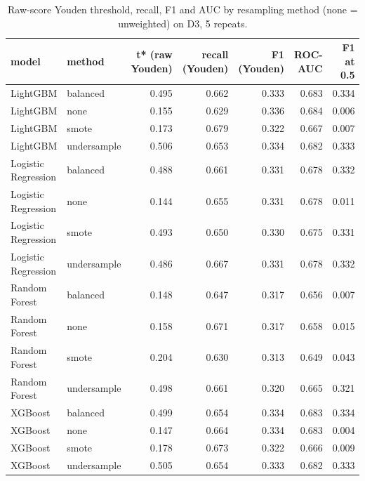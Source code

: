 \begin{table}[t]
\centering
\caption{Raw-score Youden threshold, recall, F1 and AUC by resampling method (none = unweighted) on D3, 5 repeats.}
\label{tab:T11a_resampling}
\small
\begin{tabular}{llrrrrr}
\toprule
model & method & t* (raw Youden) & recall (Youden) & F1 (Youden) & ROC-AUC & F1 at 0.5 \\
\midrule
LightGBM & balanced & 0.495 & 0.662 & 0.333 & 0.683 & 0.334 \\
LightGBM & none & 0.155 & 0.629 & 0.336 & 0.684 & 0.006 \\
LightGBM & smote & 0.173 & 0.679 & 0.322 & 0.667 & 0.007 \\
LightGBM & undersample & 0.506 & 0.653 & 0.334 & 0.682 & 0.333 \\
Logistic Regression & balanced & 0.488 & 0.661 & 0.331 & 0.678 & 0.332 \\
Logistic Regression & none & 0.144 & 0.655 & 0.331 & 0.678 & 0.011 \\
Logistic Regression & smote & 0.493 & 0.650 & 0.330 & 0.675 & 0.331 \\
Logistic Regression & undersample & 0.486 & 0.667 & 0.331 & 0.678 & 0.332 \\
Random Forest & balanced & 0.148 & 0.647 & 0.317 & 0.656 & 0.007 \\
Random Forest & none & 0.158 & 0.671 & 0.317 & 0.658 & 0.015 \\
Random Forest & smote & 0.204 & 0.630 & 0.313 & 0.649 & 0.043 \\
Random Forest & undersample & 0.498 & 0.661 & 0.320 & 0.665 & 0.321 \\
XGBoost & balanced & 0.499 & 0.654 & 0.334 & 0.683 & 0.334 \\
XGBoost & none & 0.147 & 0.664 & 0.334 & 0.683 & 0.004 \\
XGBoost & smote & 0.178 & 0.673 & 0.322 & 0.666 & 0.009 \\
XGBoost & undersample & 0.505 & 0.654 & 0.333 & 0.682 & 0.333 \\
\bottomrule
\end{tabular}
\end{table}
